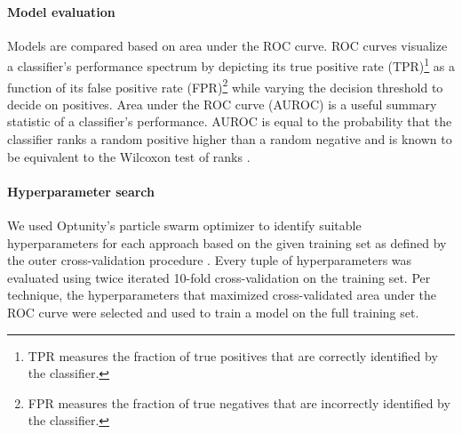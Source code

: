 \documentclass[twoside,11pt]{article}
\begin{document}
\paragraph{Model evaluation}
Models are compared based on area under the ROC curve. ROC curves visualize a classifier's performance spectrum by depicting its true positive rate (TPR)\footnote{TPR measures the fraction of true positives that are correctly identified by the classifier.} as a function of its false positive rate (FPR)\footnote{FPR measures the fraction of true negatives that are incorrectly identified by the classifier.} while varying the decision threshold to decide on positives. Area under the ROC curve (AUROC) is a useful summary statistic of a classifier's performance. AUROC is equal to the probability that the classifier ranks a random positive higher than a random negative and is known to be equivalent to the Wilcoxon test of ranks \citep{hanley1982meaning}.

\paragraph{Hyperparameter search} 
We used Optunity's particle swarm optimizer to identify suitable hyperparameters for each approach based on the given training set as defined by the outer cross-validation procedure \citep{claesen2014easy}. Every tuple of hyperparameters was evaluated using twice iterated 10-fold cross-validation on the training set. Per technique, the hyperparameters that maximized cross-validated area under the ROC curve were selected and used to train a model on the full training set.
\end{document}
